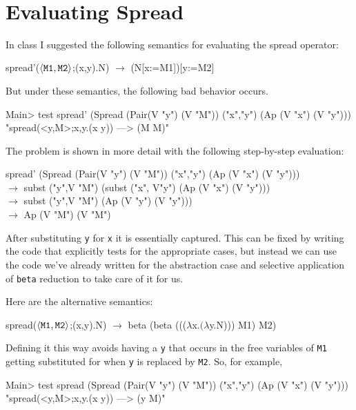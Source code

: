 \documentclass[11pt]{article}
\begin{document}
\ \\
\section{Evaluating Spread}

In class I suggested the following semantics for evaluating the spread
operator:

\begin{program*}
\>    spread'(${\langle{{\tt{M1}},{\tt{M2}}}\rangle}$;(x,y).N) $\longrightarrow$ (N[x:=M1])[y:=M2] 
\end{program*}

\noindent{}But under these semantics, the following bad behavior occurs.

\begin{program*}
\>  Main> test spread'  (Spread (Pair(V "y") (V "M")) ("x","y") (Ap (V "x") (V "y")))  \\
\>  "spread(<y,M>;x,y.(x y)) ---> (M M)" 
\end{program*}

\noindent{}The problem is shown in more detail with the following step-by-step evaluation:
\begin{program*}
\>  spread'  (Spread (Pair(V "y") (V "M")) ("x","y") (Ap (V "x") (V "y"))) \\
\>  $\longrightarrow$ subst ("y",V "M") (subst ("x", V"y") (Ap (V "x") (V "y")))  \\
\>  $\longrightarrow$ subst ("y",V "M") (Ap (V "y") (V "y")))  \\
\>  $\longrightarrow$ Ap (V "M") (V "M") 
\end{program*}
After substituting {\tt{y}} for {\tt{x}} it is essentially captured. This can
be fixed by writing the code that explicitly tests for the appropriate cases,
but instead we can use the code we've already written for the abstraction case
and selective application of {\tt{beta}} reduction to take care of it for us.

Here are the alternative semantics:

\begin{program*}
\>    spread(${\langle{{\tt{M1}},{\tt{M2}}}\rangle}$;(x,y).N) $\longrightarrow$ beta (beta ((($\lambda{}$x.$(\lambda$y.N))) M1) M2) 
\end{program*}

Defining it this way avoids having a {\tt{y}} that occurs in the free variables
of {\tt{M1}} getting substituted for when {\tt{y}} is replaced by {\tt{M2}}.  So, for example,

\begin{program*}
\>  Main> test spread  (Spread (Pair(V "y") (V "M")) ("x","y") (Ap (V "x") (V "y")))  \\
\>  "spread(<y,M>;x,y.(x y)) ---> (y M)" 
\end{program*}

\end{document}
